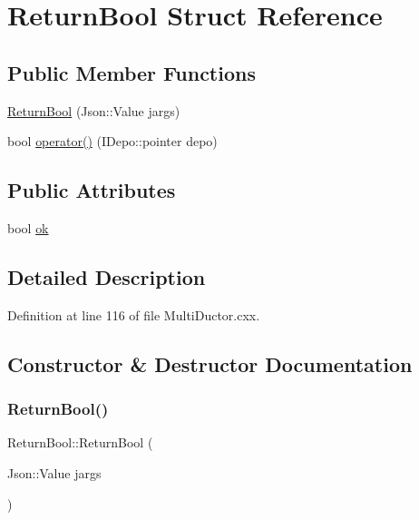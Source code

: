 \hypertarget{struct_return_bool}{}\section{Return\+Bool Struct Reference}
\label{struct_return_bool}
\subsection*{Public Member Functions}
\begin{DoxyCompactItemize}
\item 
\hyperlink{struct_return_bool_ad804df8862afb29abd4cdc6ce7539a23}{Return\+Bool} (Json\+::\+Value jargs)
\item 
bool \hyperlink{struct_return_bool_a2b78de0cf7fac096c81f665d4b9b1651}{operator()} (I\+Depo\+::pointer depo)
\end{DoxyCompactItemize}
\subsection*{Public Attributes}
\begin{DoxyCompactItemize}
\item 
bool \hyperlink{struct_return_bool_afd1914df3e1f06a88c0c29530307340f}{ok}
\end{DoxyCompactItemize}


\subsection{Detailed Description}


Definition at line 116 of file Multi\+Ductor.\+cxx.



\subsection{Constructor \& Destructor Documentation}
\mbox{\label{struct_return_bool_ad804df8862afb29abd4cdc6ce7539a23}} 
\subsubsection{\texorpdfstring{Return\+Bool()}{ReturnBool()}}
{\footnotesize\ttfamily Return\+Bool\+::\+Return\+Bool (\begin{DoxyParamCaption}\item[{Json\+::\+Value}]{jargs }\end{DoxyParamCaption})\hspace{0.3cm}{\ttfamily [inline]}}



